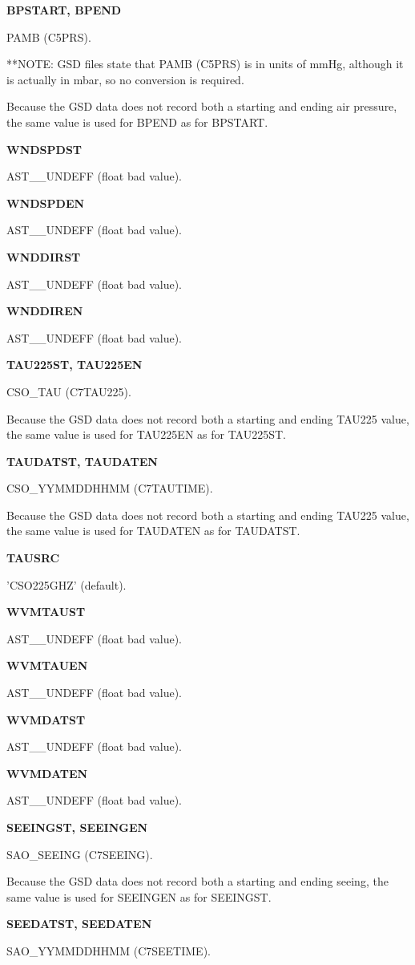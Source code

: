 \documentclass[twoside,11pt,nolof]{starlink}
\providecommand{\pamb}{PAMB (C5PRS)}
\providecommand{\tauCSO}{CSO\_TAU (C7TAU225)}
\providecommand{\tauTime}{CSO\_YYMMDDHHMM (C7TAUTIME)}
\providecommand{\seeing}{SAO\_SEEING (C7SEEING)}
\providecommand{\seeTime}{SAO\_YYMMDDHHMM (C7SEETIME)}
\begin{document}
\textbf{BPSTART, BPEND}

\pamb.

**NOTE: GSD files state that \pamb{} is in units of mmHg, although it is actually in mbar, so no conversion is required.

Because the GSD data does not record both a starting and ending air pressure, the same value is used for BPEND as for BPSTART.

\textbf{WNDSPDST}

AST\_\_UNDEFF (float bad value).

\textbf{WNDSPDEN}

AST\_\_UNDEFF (float bad value).

\textbf{WNDDIRST}

AST\_\_UNDEFF (float bad value).

\textbf{WNDDIREN}

AST\_\_UNDEFF (float bad value).

\textbf{TAU225ST, TAU225EN}

\tauCSO.

Because the GSD data does not record both a starting and ending TAU225 value, the same value is used for TAU225EN as for TAU225ST.

\textbf{TAUDATST, TAUDATEN}

\tauTime.

Because the GSD data does not record both a starting and ending TAU225 value, the same value is used for TAUDATEN as for TAUDATST.

\textbf{TAUSRC}

'CSO225GHZ' (default).

\textbf{WVMTAUST}

AST\_\_UNDEFF (float bad value).

\textbf{WVMTAUEN}

AST\_\_UNDEFF (float bad value).

\textbf{WVMDATST}

AST\_\_UNDEFF (float bad value).

\textbf{WVMDATEN}

AST\_\_UNDEFF (float bad value).

\textbf{SEEINGST, SEEINGEN}

\seeing.

Because the GSD data does not record both a starting and ending seeing, the same value is used for SEEINGEN as for SEEINGST.

\textbf{SEEDATST, SEEDATEN}

\seeTime.
\end{document}
